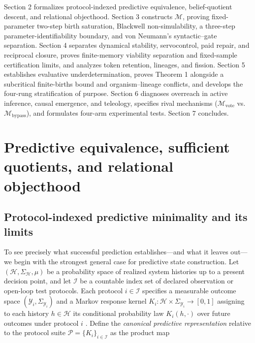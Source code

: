 \documentclass[11pt,a4paper]{article}
\begin{document}
Section 2 formalizes protocol-indexed predictive equivalence,
belief-quotient descent, and relational objecthood. Section 3 constructs
\(\mathcal{M}\), proving fixed-parameter two-step birth saturation,
Blackwell non-simulability, a three-step parameter-identifiability
boundary, and von Neumann's syntactic--gate separation. Section 4
separates dynamical stability, servocontrol, paid repair, and reciprocal
closure, proves finite-memory viability separation and fixed-sample
certification limits, and analyzes token retention, lineages, and
fission. Section 5 establishes evaluative underdetermination, proves
Theorem 1 alongside a subcritical finite-births bound and
organism--lineage conflicts, and develops the four-rung stratification
of purpose. Section 6 diagnoses overreach in active inference, causal
emergence, and teleology, specifies rival mechanisms
(\(\mathcal{M}_{\mathrm{vote}}\) vs.~\(\mathcal{M}_{\mathrm{bypass}}\)),
and formulates four-arm experimental tests. Section 7 concludes.

\section{Predictive equivalence, sufficient quotients, and relational
objecthood}\label{predictive-equivalence-sufficient-quotients-and-relational-objecthood}

\subsection{Protocol-indexed predictive minimality and its
limits}\label{protocol-indexed-predictive-minimality-and-its-limits}

To see precisely what successful prediction establishes---and what it
leaves out---we begin with the strongest general case for predictive
state construction. Let \((\mathcal{H}, \Sigma_{\mathcal{H}}, \mu)\) be
a probability space of realized system histories up to a present
decision point, and let \(\mathcal{I}\) be a countable index set of
declared observation or open-loop test protocols. Each protocol
\(i \in \mathcal{I}\) specifies a measurable outcome space
\((\mathcal{Y}_i, \Sigma_{\mathcal{Y}_i})\) and a Markov response kernel
\(K_i: \mathcal{H} \times \Sigma_{\mathcal{Y}_i} \to [0,1]\) assigning
to each history \(h \in \mathcal{H}\) its conditional probability law
\(K_i(h, \cdot)\) over future outcomes under protocol \(i\)
\citep{blackwell1953, kallenberg2021}. Define the \emph{canonical
predictive representation} relative to the protocol suite
\(\mathcal{P} = \{K_i\}_{i \in \mathcal{I}}\) as the product map
\end{document}
